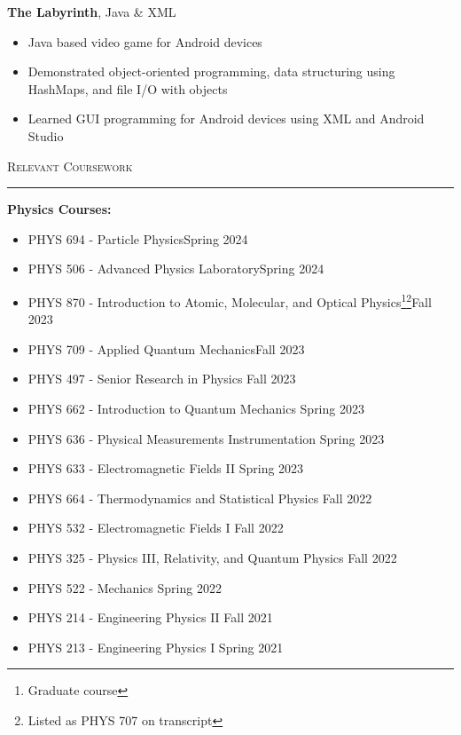 \documentclass{article}
\newcommand{\sect}[1]{
\noindent\large{\textsc{#1}}\\[-6pt]\normalsize{\noindent\rule{\textwidth}{0.5pt}}
}
\begin{document}
\textbf{The Labyrinth}, Java \& XML
\begin{itemize}
	\item Java based video game for Android devices
	\item Demonstrated object-oriented programming, data structuring using HashMaps, and file I/O with objects
	\item Learned GUI programming for Android devices using XML and Android Studio
\end{itemize}
\newpage
\sect{Relevant Coursework}
\textbf{Physics Courses:}\begin{itemize}
	\item PHYS 694 - Particle Physics\hfill Spring 2024
	\item PHYS 506 - Advanced Physics Laboratory\hfill Spring 2024
	\item PHYS 870 - Introduction to Atomic, Molecular, and Optical Physics\footnote[1]{Graduate course}\footnote[2]{Listed as PHYS 707 on transcript}\hfill Fall 2023
	\item PHYS 709 - Applied Quantum Mechanics\hfill Fall 2023
	\item PHYS 497 - Senior Research in Physics \hfill Fall 2023
	\item PHYS 662 - Introduction to Quantum Mechanics \hfill Spring 2023
	\item PHYS 636 - Physical Measurements Instrumentation \hfill Spring 2023
	\item PHYS 633 - Electromagnetic Fields II \hfill Spring 2023
	\item PHYS 664 - Thermodynamics and Statistical Physics \hfill Fall 2022
	\item PHYS 532 - Electromagnetic Fields I \hfill Fall 2022
	\item PHYS 325 - Physics III, Relativity, and Quantum Physics \hfill Fall 2022
	\item PHYS 522 - Mechanics \hfill Spring 2022
	\item PHYS 214 - Engineering Physics II \hfill Fall 2021
	\item PHYS 213 - Engineering Physics I \hfill Spring 2021\\[-12pt]
\end{itemize}
\end{document}

